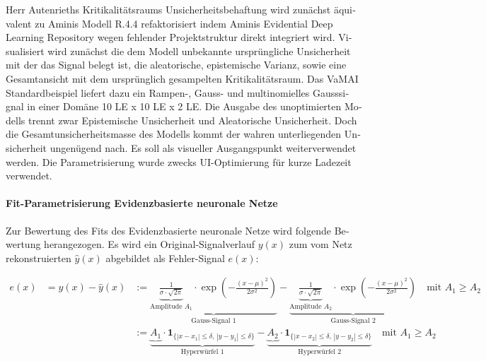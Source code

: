 \begin{otherlanguage}{ngerman}
Herr Autenrieths Kritikalitätsraums Unsicherheitsbehaftung wird zunächst äquivalent zu Aminis Modell R.4.4 refaktorisiert indem Aminis \glqq{}Evidential Deep Learning\grqq{} Repository wegen fehlender Projektstruktur direkt integriert wird. Visualisiert wird zunächst die dem Modell unbekannte ursprüngliche Unsicherheit mit der das Signal belegt ist, die aleatorische, epistemische Varianz, sowie eine Gesamtansicht mit dem ursprünglich gesampelten Kritikalitätsraum. Das VaMAI Standardbeispiel liefert dazu ein Rampen-, Gauss- und multinomielles Gausssignal in einer Domäne 10 LE x 10 LE x 2 LE. Die Ausgabe des unoptimierten Modells trennt zwar \gls{Epistemische Unsicherheit} und \gls{Aleatorische Unsicherheit}. Doch die Gesamtunsicherheitsmasse des Modells kommt der wahren unterliegenden Unsicherheit ungenügend nach. Es soll als visueller Ausgangspunkt weiterverwendet werden. Die Parametrisierung wurde zwecks UI-Optimierung für kurze Ladezeit verwendet.



\paragraph{Fit-Parametrisierung \gls{Evidenzbasierte neuronale Netze}} Zur Bewertung des Fits des \gls{Evidenzbasierte neuronale Netze} wird folgende Bewertung herangezogen. %
Es wird ein Original-Signalverlauf $y(x)$ zum vom Netz rekonstruierten $\hat{y}(x)$ abgebildet als Fehler-Signal $e(x)$: 

{\small
\begin{align}
e(x)     &= y(x) - \hat{y}(x)
& :=
\underbrace{
  \underbrace{\frac{1}{\sigma \cdot \sqrt{2\pi}}}_{\text{Amplitude } A_1}
  \cdot \exp\left( -\frac{(x - \mu)^2}{2\sigma^2} \right)
}_{\text{Gauss-Signal 1}}
- 
\underbrace{
  \underbrace{\frac{1}{\sigma \cdot \sqrt{2\pi}}}_{\text{Amplitude } A_2}
  \cdot \exp\left( -\frac{(x - \mu)^2}{2\sigma^2} \right)
}_{\text{Gauss-Signal 2}}
\quad \text{mit } A_1 \geq A_2
\\[1.0em]
& & :=
\underbrace{
  \underbrace{A_1}
  \cdot \mathbf{1}_{\{|x - x_1| \leq \delta,\, |y - y_1| \leq \delta\}}
}_{\text{Hyperwürfel 1}}
-
\underbrace{
  \underbrace{A_2}
  \cdot \mathbf{1}_{\{|x - x_2| \leq \delta,\, |y - y_2| \leq \delta\}}
}_{\text{Hyperwürfel 2}}
\quad \text{mit } A_1 \geq A_2
\end{align}
}




\end{otherlanguage}
